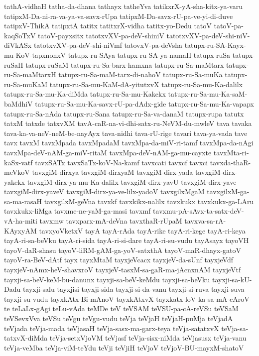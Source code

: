 {tathA-vidhaH
tatha-da-dhana
tathayx
tatheYva
tatikxrX-yA-sha-kitx-ya-varu
tatipxM-Da-ni-ra-va-ya-va-savx-rUpa
tatipxM-Da-savx-rU-pa-ve-yi-di-duve
tatipxV-ThikA
tatipxtA
tatitx
tatitxrX-vidha
tatitx-yo-Dedu
tatoV
tatoV-pa-kaqSoTxV
tatoV-payxsitx
tatotxvXV-pa-deV-shiniV
tatotxvXV-pa-deV-shi-niV-diVkASx
tatotxvXV-pa-deV-shi-niVmf
tatovxV-pa-deVsha
tatupx-ru-SA-Kayx-mu-KoV-tapxnonxV
tatupx-ru-SAya
tatupx-ru-SA-ya-namaH
tatupx-ruSa
tatupx-ruSaH
tatupx-ruSaM
tatupx-ru-Sa-barx-hamxna
tatupx-ru-Sa-maMtarx
tatupx-ru-Sa-maMtarxH
tatupx-ru-Sa-maM-tarx-di-nahoV
tatupx-ru-Sa-muKa
tatupx-ru-Sa-muKaM
tatupx-ru-Sa-mu-KaM-dA-yitutxvX
tatupx-ru-Sa-mu-Ka-dalilx
tatupx-ru-Sa-mu-Ka-diMda
tatupx-ru-Sa-mu-Kakekx
tatupx-ru-Sa-mu-Ka-saM-baMdhiV
tatupx-ru-Sa-mu-Ka-savx-rU-pa-dAdx-gide
tatupx-ru-Sa-mu-Ka-vapapx
tatupx-ru-Sa-nAda
tatupx-ru-Sana
tatupx-ru-Sa-va-danaM
tatupx-rupa
tatutx
tatxM
tatxde
tatxvXM
tavA-caR-na-vi-dhi-satx-ru-NeVM-du-mwleV
tava
tavaka
tava-ka-va-neV-neM-be-nayAyx
tava-nidhi
tava-rU-rige
tavari
tava-ya-vada
tave
tavx
tavxM
tavxMpada
tavxMpadaM
tavxMpa-da-miV-ri-tamf
tavxMpa-da-nAgi
tavxMpa-deV-nAM-ga-miV-ritaM
tavxMpa-deV-nAM-ga-mu-cayxte
tavxMta-ri-kaSx-vatf
tavxSATx
tavxSaTx-koV-Na-kamf
tavxcati
tavxcf
tavxci
tavxda-thaR-meVkoV
tavxgiM-dirxya
tavxgiM-dirxyaM
tavxgiM-dirx-yada
tavxgiM-dirx-yakekx
tavxgiM-dirx-ya-mu-Ka-dalilx
tavxgiM-dirx-yavU
tavxgiM-dirx-yave
tavxgiM-dirx-yaveV
tavxgiM-dirx-ya-ve-lilx-yadoV
tavxgilxMgaM
tavxgilxM-ga-sa-ma-rasaH
tavxgilxM-geVna
tavxkf
tavxkikx-nalilx
tavxkukx
tavxkukx-ga-LAru
tavxkukx-liMga
tavxme-ne-yaM-ga-masi
tavxmf
tavxmu-pA-sAvx-ta-satx-deV-vA-ha-miti
tavxmw
tavxparx-mA-deVna
tavxthaR-rUpaM
tavxva-sa-rA-KAyxyAM
tavxyoVketxV
tayA
tayA-rAda
tayA-rike
tayA-ri-kege
tayA-ri-keya
tayA-ri-sa-beVku
tayA-ri-sida
tayA-ri-si-dare
tayA-ri-su-vudu
tayAsayx
tayoVH
tayoV-daR-shasu
tayoV-liRM-gAM-ga-yoV-satxthA
tayoV-maR-dhayx-gatoV
tayoV-ra-BeV-dAtf
tayx
tayxMtaM
tayxjeVcacx
tayxjeV-da-sUnf
tayxjeVdf
tayxjeV-nAmx-heV-shavxroV
tayxjeV-tasxM-sa-gaR-ma-jAcnxnAM
tayxjeVtf
tayxji-sa-beV-keM-bu-danunx
tayxji-sa-beV-keMdu
tayxji-sa-beVku
tayxji-sa-kU-Dadu
tayxji-salu
tayxjisi
tayxji-sida
tayxji-si-da-vanu
tayxji-si-ruva
tayxji-suva
tayxji-su-vudu
tayxkAtx-Bi-mAnoV
tayxkAtxvX
tayxkatx-loV-ka-sa-mA-cAroV
te
teLaLx-gAgi
teLu-vAda
teMDe
teV
teVSAM
teVSU-pa-cA-reVSu
teVSaM
teVSevxVva
teVSu
teVgu
teVgu-vudu
teVja
teVjaH
teVjaH-puMja
teVjadA
teVjada
teVja-mada
teVjasaH
teVja-sasx-ma-garx-teya
teVja-satatxvX
teVja-sa-tatxvX-diMda
teVja-setxVjoVM
teVjasf
teVja-sisx-niMda
teVjasusx
teVja-vanu
teVja-veMba
teVja-viM-teYdu
teVji
teVjiH
teVjoV
teVjoV-BU-mayxM-shatoV
}
